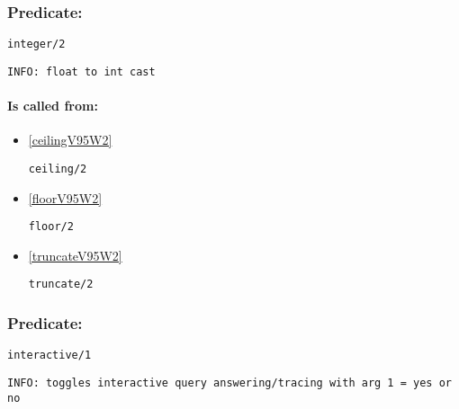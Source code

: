 \subsubsection{Predicate:} \label{integerV95W2}

\begin{verbatim}
integer/2
\end{verbatim}

{\small \begin{verbatim}
INFO: float to int cast

\end{verbatim}}
\paragraph{Is called from:} 
\begin{itemize}
\item \ref{ceilingV95W2} 
\begin{verbatim}
ceiling/2
\end{verbatim}

\item \ref{floorV95W2} 
\begin{verbatim}
floor/2
\end{verbatim}

\item \ref{truncateV95W2} 
\begin{verbatim}
truncate/2
\end{verbatim}

\end{itemize}

\subsubsection{Predicate:} \label{interactiveV95W1}

\begin{verbatim}
interactive/1
\end{verbatim}

{\small \begin{verbatim}
INFO: toggles interactive query answering/tracing with arg 1 = yes or no

\end{verbatim}}

